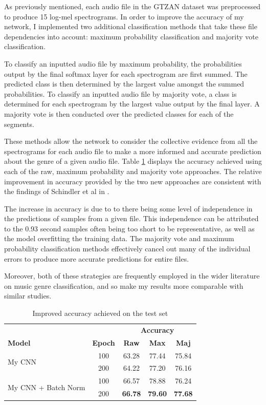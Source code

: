 \documentclass[conference]{IEEEtran}
\begin{document}
As previously mentioned, each audio file in the GTZAN \cite{TzanetakisCook} dataset was preprocessed to produce 15 log-mel spectrograms.
In order to improve the accuracy of my network, I implemented two additional classification methods that take these file dependencies into account: maximum probability classification and majority vote classification.

To classify an inputted audio file by maximum probability, the probabilities output by the final softmax layer for each spectrogram are first summed.
The predicted class is then determined by the largest value amongst the summed probabilities.
To classify an inputted audio file by majority vote, a class is determined for each spectrogram by the largest value output by the final layer.
A majority vote is then conducted over the predicted classes for each of the segments.

These methods allow the network to consider the collective evidence from all the spectrograms for each audio file to make a more informed and accurate prediction about the genre of a given audio file. 
Table \ref{improved_results} displays the accuracy achieved using each of the raw, maximum probability and majority vote approaches.
The relative improvement in accuracy provided by the two new approaches are consistent with the findings of Schindler et al in \cite{SchindlerLidyRauber}.

The increase in accuracy is due to to there being some level of independence in the predictions of samples from a given file.
This independence can be attributed to the 0.93 second samples often being too short to be representative, as well as the model overfitting the training data.
The majority vote and maximum probability classification methods effectively cancel out many of the individual errors to produce more accurate predictions for entire files.

Moreover, both of these strategies are frequently employed in the wider literature on music genre classification, and so make my results more comparable with similar studies.

\begin{table}[htbp]
    \caption{Improved accuracy achieved on the test set}
    \begin{center}
    \begin{tabular}{l c c c c}
    \toprule
    &&\multicolumn{3}{c}{\textbf{Accuracy}}\\
    \cmidrule(lr){3-5}
    \textbf{Model}&\textbf{Epoch}&\textbf{Raw}&\textbf{Max}&\textbf{Maj}\\
    \midrule
    \multirow{ 2}{*}{My CNN} & 100 & 63.28 & 77.44 & 75.84 \\
    & 200 & 64.22 & 77.20 & 76.16 \\
    \midrule
    \multirow{ 2}{*}{My CNN + Batch Norm} & 100 & 66.57 & 78.88 & 76.24 \\
    & 200 & \textbf{66.78} & \textbf{79.60} & \textbf{77.68} \\
    \bottomrule
    \end{tabular}
    \label{improved_results}
    \end{center}
\end{table}
\end{document}
